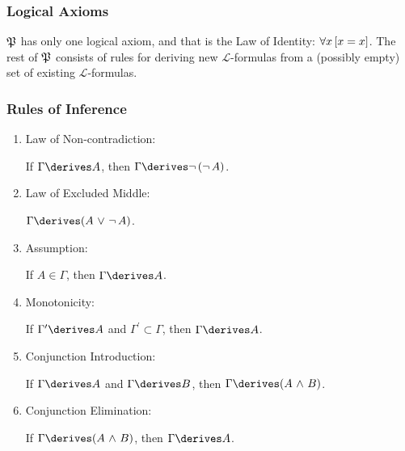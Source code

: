 \subsubsection*{Logical Axioms}
\( \mathfrak{P} \) has only one logical axiom, and that is the Law of Identity: \( \forall x \, \mleft[ x = x \mright] \).
The rest of \( \mathfrak{P} \) consists of rules for deriving new \( \mathcal{L} \)-formulas from a (possibly empty) set of
existing \( \mathcal{L} \)-formulas.

\subsubsection*{Rules of Inference}
\begin{enumerate}[topsep=2pt,itemsep=10pt,label=\textup{\texttt{(\arabic*)}}]
    \item Law of Non-contradiction:  \label{rule-of-inference:law-of-non-contradiction}

        If \( \Gamma \derives A \), then \( \Gamma \derives \lnot \, \mleft( \lnot \, A \mright) \).

    \item Law of Excluded Middle:  \label{rule-of-inference:law-of-excluded-middle}

        \( \Gamma \derives \mleft( A \,\,{\lor}\,\, \lnot \, A \mright) \).

    \item {Assumption}:  \label{rule-of-inference:assumption}

        If \( A \in \Gamma \), then \( \Gamma \derives A \).

    \item Monotonicity:  \label{rule-of-inference:monotonicity}

        If \( \Gamma^{\prime} \derives A \) and \( \Gamma^{\prime} \subset \Gamma \), then \( \Gamma \derives A \).

    \item Conjunction Introduction:  \label{rule-of-inference:conjunction-introduction}

        If \( \Gamma \derives A \) and \( \Gamma \derives B \), then \( \Gamma \derives \mleft( A \,\,{\land}\,\, B \mright) \).

    \item Conjunction Elimination:  \label{rule-of-inference:conjunction-elimination}

        If \( \Gamma \derives \mleft( A \,\,{\land}\,\, B \mright) \), then \( \Gamma \derives A \).


\end{enumerate}
